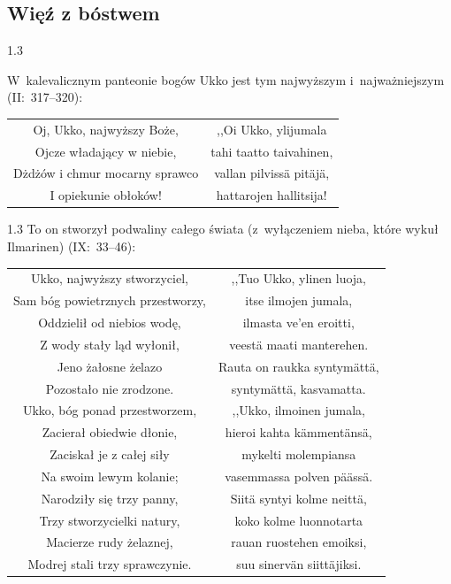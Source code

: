 \documentclass[11pt,a4paper,twoside]{report}
\begin{document}
\subsection*{Więź z bóstwem}
\begin{spacing}{1.3}

W~kalevalicznym panteonie bogów Ukko jest tym najwyższym i~najważniejszym (II:~317--320):
\end{spacing}
{\centering
\small
\begin{longtable}{c c}
Oj, Ukko, najwyższy Boże, & ,,Oi Ukko, ylijumala \\
Ojcze władający w niebie, & tahi taatto taivahinen, \\
Dżdżów i chmur mocarny sprawco & vallan pilvissä pitäjä, \\
I opiekunie obłoków! & hattarojen hallitsija! \\
\end{longtable}
}
\newpage
\begin{spacing}{1.3}
To on stworzył podwaliny całego świata (z~wyłączeniem nieba, które wykuł Ilmarinen) (IX:~33--46):
\end{spacing}
{\centering
\small
\begin{longtable}{c c}
Ukko, najwyższy stworzyciel, & ,,Tuo Ukko, ylinen luoja, \\
Sam bóg powietrznych przestworzy, & itse ilmojen jumala, \\
Oddzielił od niebios wodę, & ilmasta ve'en eroitti, \\
Z wody stały ląd wyłonił, & veestä maati manterehen. \\
Jeno żałosne żelazo & Rauta on raukka syntymättä, \\
Pozostało nie zrodzone. & syntymättä, kasvamatta. \\
Ukko, bóg ponad przestworzem, & ,,Ukko, ilmoinen jumala, \\
Zacierał obiedwie dłonie, & hieroi kahta kämmentänsä, \\
Zaciskał je z całej siły & mykelti molempiansa \\
Na swoim lewym kolanie; & vasemmassa polven päässä. \\
Narodziły się trzy panny, & Siitä syntyi kolme neittä, \\
Trzy stworzycielki natury, & koko kolme luonnotarta \\
Macierze rudy żelaznej, & rauan ruostehen emoiksi,\\
Modrej stali trzy sprawczynie. & suu sinervän siittäjiksi.\\
\end{longtable}
}
\vspace*{0.5\baselineskip}
\end{document}
